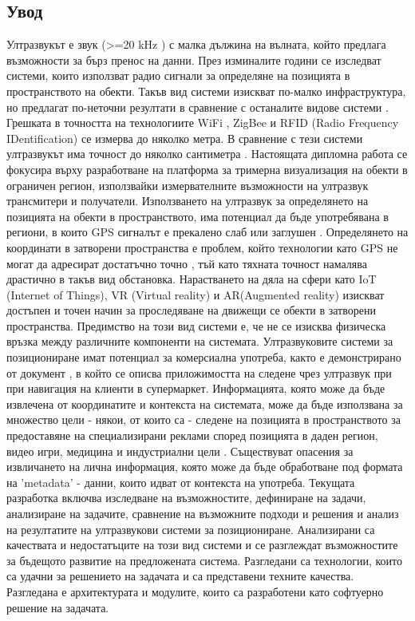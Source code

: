 \subsection{Увод}
\tab Ултразвукът е звук (>=20 kHz \cite{batmobile}) с малка дължина на вълната, който предлага възможности за бърз пренос на данни. През изминалите години се изследват системи, които използват радио сигнали за определяне на позицията в пространството на обекти. Такъв вид системи изискват по-малко инфраструктура, но предлагат по-неточни резултати в сравнение с останалите видове системи \cite{CarlosMedina}. Грешката в точността на технологиите WiFi \cite{wifi}, ZigBee \cite{zigbee} и RFID (Radio Frequency IDentification) \cite{rfid} се измерва до няколко метра. В сравнение с тези системи ултразвукът има точност до няколко сантиметра \cite{CarlosMedina} \cite{columbia}. Настоящата дипломна работа се фокусира върху разработване на платформа за тримерна визуализация на обекти в ограничен регион, използвайки измервателните възможности на ултразвук трансмитери и получатели. Използването на ултразвук за определянето на позицията на обекти в пространството, има потенциал да бъде употребявана в региони, в които GPS сигналът е прекалено слаб или заглушен \cite{yonei}. Определянето на координати в затворени пространства е проблем, който технологии като GPS не могат да адресират достатъчно точно \cite{gpsIsBadIndoor}, тъй като тяхната точност намалява драстично в такъв вид обстановка. Нарастването на дяла на сфери като IoT (Internet of Things), VR (Virtual reality) и AR(Augmented reality) изискват достъпен и точен начин за проследяване на движещи се обекти в затворени пространства. Предимство на този вид системи е, че не се изисква физическа връзка между различните компоненти на системата. Ултразвуковите системи за позициониране имат потенциал за комерсиална употреба, както е демонстрирано от документ \cite{batmobile}, в който се описва приложимостта на следене чрез ултразвук при при навигация на клиенти в супермаркет. Информацията, която може да бъде извлечена от координатите и контекста на системата, може да бъде използвана за множество цели - някои, от които са - следене на позицията в пространството за предоставяне на специализирани реклами според позицията в даден регион, видео игри, медицина и индустриални цели \cite{bristolBeacons}. Съществуват опасения за извличането на лична информация, която може да бъде обработване под формата на 'metadata' - данни, които идват от контекста на употреба. Текущата разработка включва изследване на възможностите, дефиниране на задачи, анализиране на задачите, сравнение на възможните подходи и решения и анализ на резултатите на ултразвукови системи за позициониране. Анализирани са качествата и недостатъците на този вид системи и се разглеждат възможностите за бъдещото развитие на предложената система. Разгледани са технологии, които са удачни за решението на задачата и са представени техните качества. Разгледана е архитектурата и модулите, които са разработени като софтуерно решение на задачата. 


